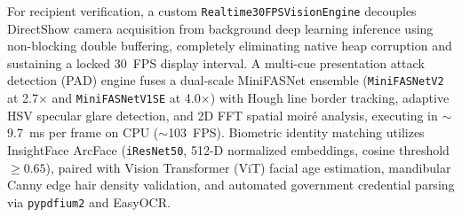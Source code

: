 \documentclass[12pt,a4paper]{report}
\begin{document}
\par
\vspace{0.3cm}

\noindent
For recipient verification, a custom \texttt{Realtime30FPSVisionEngine} decouples DirectShow camera acquisition from background deep learning inference using non-blocking double buffering, completely eliminating native heap corruption and sustaining a locked 30~FPS display interval. A multi-cue presentation attack detection (PAD) engine fuses a dual-scale MiniFASNet ensemble (\texttt{MiniFASNetV2} at 2.7$\times$ and \texttt{MiniFASNetV1SE} at 4.0$\times$) with Hough line border tracking, adaptive HSV specular glare detection, and 2D FFT spatial moir\'{e} analysis, executing in $\sim$9.7~ms per frame on CPU ($\sim$103~FPS). Biometric identity matching utilizes InsightFace ArcFace (\texttt{iResNet50}, 512-D normalized embeddings, cosine threshold $\ge 0.65$), paired with Vision Transformer (ViT) facial age estimation, mandibular Canny edge hair density validation, and automated government credential parsing via \texttt{pypdfium2} and EasyOCR.

\par
\vspace{0.3cm}
\end{document}
